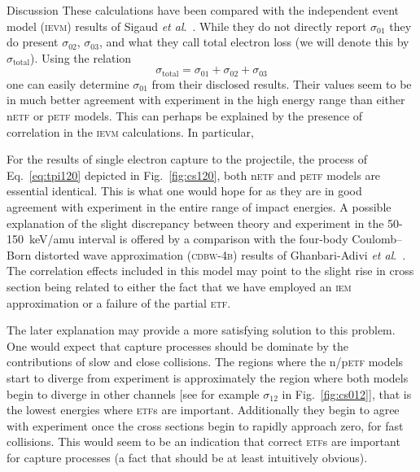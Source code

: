 \documentclass[aps, pra, reprint, groupedaddress, amsfonts, longbibliography,
               amsmath, amssymb, showpacs, nofootinbib]{revtex4-1}
\begin{document}
\begin{section}{Discussion \label{sec:disc}}
   These calculations have been compared with the independent event model (\textsc{ievm}) results of
   Sigaud \textit{et al}.~\cite{SM-03}. While they do not directly report $\sigma_{01}$ they do present
   $\sigma_{02}$, $\sigma_{03}$, and what they call total electron loss (we will denote this by
   $\sigma_\mathrm{total}$). Using the relation
   \begin{equation} \label{eq:total}
      \sigma_\mathrm{total} = \sigma_{01} + \sigma_{02} + \sigma_{03}
   \end{equation}
   one can easily determine $\sigma_{01}$ from their disclosed results. Their values seem to be in much
   better agreement with experiment in the high energy range than either n\textsc{etf} or p\textsc{etf}
   models. This can perhaps be explained by the presence of correlation in the \textsc{ievm}
   calculations.
   In particular,    %

   For the results of single electron capture to the projectile, the process of Eq.~\eqref{eq:tpi120}
   depicted in Fig.~\ref{fig:cs120}, both n\textsc{etf} and p\textsc{etf} models are essential
   identical. This is what one would hope for as they are in good agreement with experiment in the
   entire range of impact energies. A possible explanation of the slight discrepancy between theory and
   experiment in the 50-150~keV/amu interval is offered by a comparison with the four-body Coulomb–Born
   distorted wave approximation (\textsc{cdbw-4b}) results of Ghanbari-Adivi
   \textit{et al}.~\cite{GAG15}. The correlation effects included in this model may point to the slight
   rise in cross section being related to either the fact that we have employed an \textsc{iem}
   approximation or a failure of the partial \textsc{etf}.

   The later explanation may provide a more satisfying solution to this problem. One would expect that
   capture processes should be dominate by the contributions of slow and close collisions. The regions
   where the n/p\textsc{etf} models start to diverge from experiment is approximately the region where
   both models begin to diverge in other channels [see for example $\sigma_{12}$ in
   Fig.~\ref{fig:cs012}], that is the lowest energies where \textsc{etf}s are important.
   Additionally they begin to agree with experiment once the cross sections begin to rapidly approach
   zero, for fast collisions. This would seem to be an indication that correct \textsc{etf}s are
   important for capture processes (a fact that should be at least intuitively obvious).


\end{section}
\end{document}

